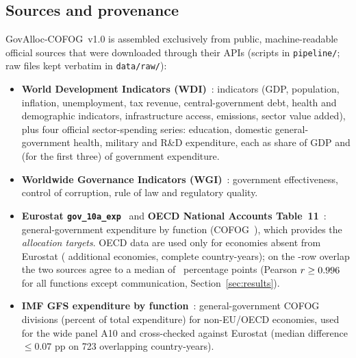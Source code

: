 \subsection{Sources and provenance}
GovAlloc-COFOG~v1.0 is assembled exclusively from public, machine-readable official sources that were downloaded through their APIs (scripts in \texttt{pipeline/}; raw files kept verbatim in \texttt{data/raw/}):
\begin{itemize}
\item \textbf{World Development Indicators (WDI)}~\cite{wdi}: \NWdiIndicators{} indicators (GDP, population, inflation, unemployment, tax revenue, central-government debt, health and demographic indicators, infrastructure access, emissions, sector value added), plus four official sector-spending series: education, domestic general-government health, military and R\&D expenditure, each as share of GDP and (for the first three) of government expenditure.
\item \textbf{Worldwide Governance Indicators (WGI)}~\cite{kaufmann2011}: government effectiveness, control of corruption, rule of law and regulatory quality.
\item \textbf{Eurostat \texttt{gov\_10a\_exp}}~\cite{eurostat_cofog} and \textbf{OECD National Accounts Table~11}~\cite{oecd_table11}: general-government expenditure by function (COFOG~\cite{un2000cofog}), which provides the \emph{allocation targets}. OECD data are used only for economies absent from Eurostat (\NOecdAdded{} additional economies, \NOecdRowsComplete{} complete country-years); on the \NOverlapRows{}-row overlap the two sources agree to a median of \NXsrcMedDiff{}~percentage points (Pearson $r\ge 0.996{}$ for all functions except communication, Section~\ref{sec:results}).
\item \textbf{IMF GFS expenditure by function}~\cite{imf_gfs}: general-government COFOG divisions (percent of total expenditure) for non-EU/OECD economies, used for the wide panel A10 and cross-checked against Eurostat (median difference $\le0.07$ pp on 723 overlapping country-years).
\end{itemize}
\figCoverage
